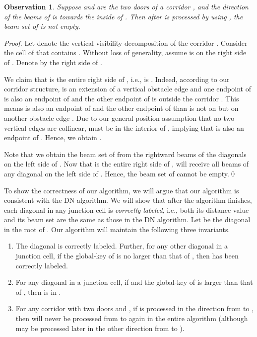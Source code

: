 \documentclass[english,runningheads,11pt]{llncs-revised}
\newtheorem{observation}{Observation}
\begin{document}
\begin{observation}\label{obser:20}
Suppose  and  are the two doors of a corridor , and the
direction of the beams of  is towards the inside of . Then after  is
processed by using , the beam set of  is not empty.
\end{observation}
\begin{proof}
Let  denote the vertical visibility decomposition of the
corridor .
Consider the cell  of  that contains .
Without loss of generality, assume  is on the right side of
. Denote by  the right side of .

We claim that  is the entire right side of , i.e.,  is .
Indeed, according to our corridor structure,  is an extension of a
vertical obstacle edge  and one endpoint  of  is also an endpoint of
 and the other endpoint of  is outside the corridor . This
means  is also an endpoint of  and
the other endpoint  of  than  is not on  but on
another obstacle edge . Due to our general position assumption
that no two vertical edges are collinear,  must be in the interior of
, implying that  is also an endpoint of . Hence, we obtain .


Note that we obtain the beam set of  from the rightward beams of
the diagonals on the left side of . Now that  is
the entire right side of ,  will receive all beams of any
diagonal on the left side of . Hence, the beam set of  cannot be empty.\qed
\end{proof}

To show the correctness of our algorithm, we will argue that
our algorithm is consistent with the DN algorithm.
We will show that after the algorithm finishes, each diagonal
in any junction cell is {\em correctly labeled}, i.e.,
both its distance value and its beam set are the same as those in the
DN algorithm.  Let  be the diagonal in the root of .
Our algorithm will maintain the following three invariants.

\begin{enumerate}
\item
The diagonal  is correctly labeled. Further,
for any other diagonal  in a junction cell, if the global-key of  is no larger than that of , then  has been  correctly labeled.




\item
For any diagonal  in a junction cell, if  and
the global-key of  is larger than that of , then  is in .

\item
For any corridor  with two doors  and , if  is
processed in the direction from  to ,
then  will never be processed from  to  again in the entire
algorithm (although  may be processed later in the other direction from  to ).
\end{enumerate}
\end{document}
